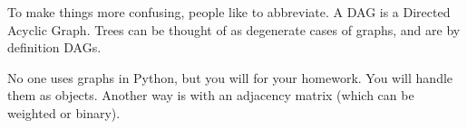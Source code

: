 \documentclass[12pt,letter]{article}
\begin{document}
To make things more confusing, people like to abbreviate. A DAG is a
Directed Acyclic Graph. Trees can be thought of as degenerate cases of
graphs, and are by definition DAGs.

No one uses graphs in Python, but you will for
your homework. You will handle them as objects. Another way is with an adjacency matrix (which can be
weighted or binary). 





\pagebreak
\onehalfspacing



\pagebreak
\end{document}
